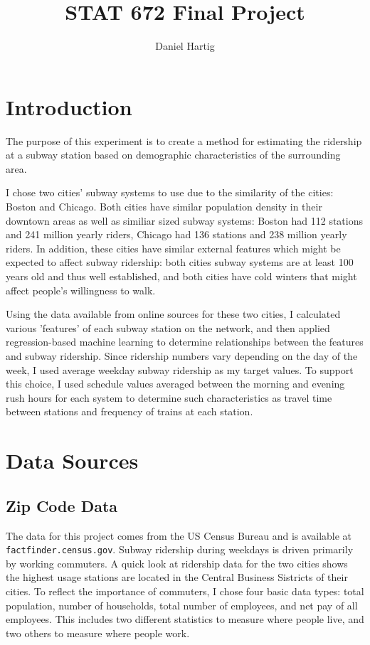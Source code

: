 \documentclass{article}
\title{STAT 672 Final Project}
\author{Daniel Hartig}
\begin{document}
\maketitle

\section{Introduction}

The purpose of this experiment is to create a method for estimating the ridership at a subway station based on demographic characteristics of the surrounding area. 

I chose two cities' subway systems to use due to the similarity of the cities: Boston and Chicago. Both cities have similar population density in their downtown areas as well as similiar sized subway systems: Boston had 112 stations and 241 million yearly riders, Chicago had 136 stations and 238 million yearly riders. In addition, these cities have similar external features which might be expected to affect subway ridership: both cities subway systems are at least 100 years old and thus well established, and both cities have cold winters that might affect people's willingness to walk. 

Using the data available from online sources for these two cities, I calculated various 'features' of each subway station on the network, and then applied regression-based machine learning to determine relationships between the features and subway ridership. Since ridership numbers vary depending on the day of the week, I used average weekday subway ridership as my target values. To support this choice, I used schedule values averaged between the morning and evening rush hours for each system to determine such characteristics as travel time between stations and frequency of trains at each station. 

\section{Data Sources}

\subsection{Zip Code Data}

The data for this project comes from the US Census Bureau and is available at \texttt{factfinder.census.gov}. Subway ridership during weekdays is driven primarily by working commuters. A quick look at ridership data for the two cities shows the highest usage stations are located in the Central Business Sistricts of their cities. To reflect the importance of commuters, I chose four basic data types: total population, number of households, total number of employees, and net pay of all employees. This includes two different statistics to measure where people live, and two others to measure where people work. 
\end{document}
